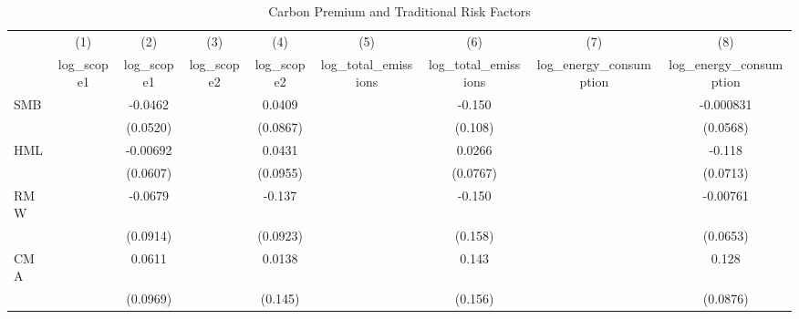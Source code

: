 \begin{table}[htbp]\centering
\def\sym#1{\ifmmode^{#1}\else\(^{#1}\)\fi}
\caption{Carbon Premium and Traditional Risk Factors}
\begin{tabular}{l*{8}{c}}
\hline\hline
                    &\multicolumn{1}{c}{(1)}&\multicolumn{1}{c}{(2)}&\multicolumn{1}{c}{(3)}&\multicolumn{1}{c}{(4)}&\multicolumn{1}{c}{(5)}&\multicolumn{1}{c}{(6)}&\multicolumn{1}{c}{(7)}&\multicolumn{1}{c}{(8)}\\
                    &\multicolumn{1}{c}{log\_scope1}&\multicolumn{1}{c}{log\_scope1}&\multicolumn{1}{c}{log\_scope2}&\multicolumn{1}{c}{log\_scope2}&\multicolumn{1}{c}{log\_total\_emissions}&\multicolumn{1}{c}{log\_total\_emissions}&\multicolumn{1}{c}{log\_energy\_consumption}&\multicolumn{1}{c}{log\_energy\_consumption}\\
\hline
SMB                 &                     &     -0.0462         &                     &      0.0409         &                     &      -0.150         &                     &   -0.000831         \\
                    &                     &    (0.0520)         &                     &    (0.0867)         &                     &     (0.108)         &                     &    (0.0568)         \\
HML                 &                     &    -0.00692         &                     &      0.0431         &                     &      0.0266         &                     &      -0.118         \\
                    &                     &    (0.0607)         &                     &    (0.0955)         &                     &    (0.0767)         &                     &    (0.0713)         \\
RMW                 &                     &     -0.0679         &                     &      -0.137         &                     &      -0.150         &                     &    -0.00761         \\
                    &                     &    (0.0914)         &                     &    (0.0923)         &                     &     (0.158)         &                     &    (0.0653)         \\
CMA                 &                     &      0.0611         &                     &      0.0138         &                     &       0.143         &                     &       0.128         \\
                    &                     &    (0.0969)         &                     &     (0.145)         &                     &     (0.156)         &                     &    (0.0876)         \\

\end{tabular}
\end{table}
